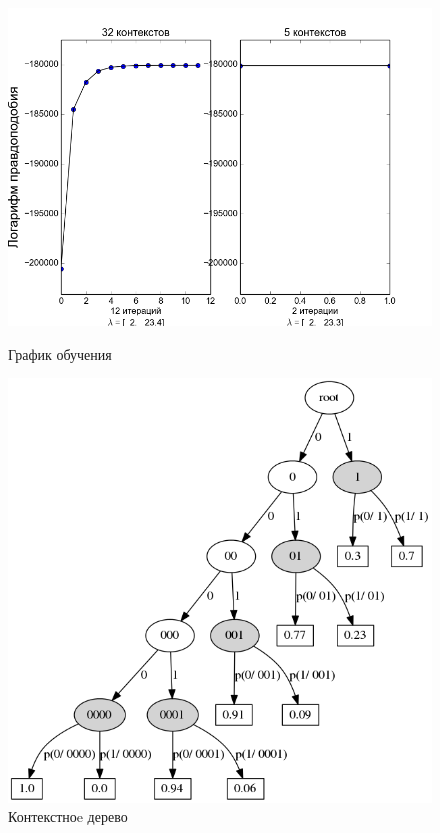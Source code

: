 \documentclass{matmex-diploma-custom}
\begin{document}
\begin{figure}[h!]\centering
\begin{minipage}[b]{0.49 \textwidth}
	\includegraphics[scale=0.47]{img/real/plot_.png}
	\centering
	\caption{ График обучения }
	\label{ris:log_likelihood}
\end{minipage}
\hfill
\begin{minipage}[b]{0.32 \textwidth}
	\includegraphics[scale=0.29]{img/real/predicted_trie.png}
	\centering
	\caption{ Контекстноe дерево }
	\label{ris:real_trie}
\end{minipage}
\end{figure}
\end{document}
